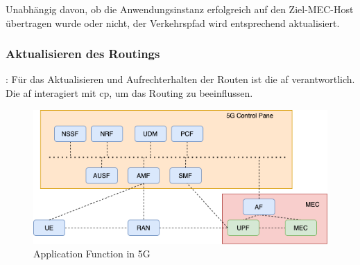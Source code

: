 \documentclass[runningheads]{llncs}
\numberwithin{figure}{section}
\begin{document}
Unabhängig davon, ob die Anwendungsinstanz erfolgreich auf den Ziel-MEC-Host übertragen wurde oder nicht, 
der Verkehrspfad wird entsprechend aktualisiert. \cite{etsiMultiaccessEdgeComputinga}
\subsubsection{Aktualisieren des Routings}:
Für das Aktualisieren und Aufrechterhalten der Routen ist die \acrlong{af} verantwortlich.
Die \acrfull{af} interagiert mit \acrshort{cp},  um das Routing zu beeinflussen. 

\begin{figure}
  \includegraphics[width=\linewidth]{images/AF_5G.png}
  \caption{Application Function in 5G}
  \label{fig:AF_GG}
\end{figure}
\end{document}
